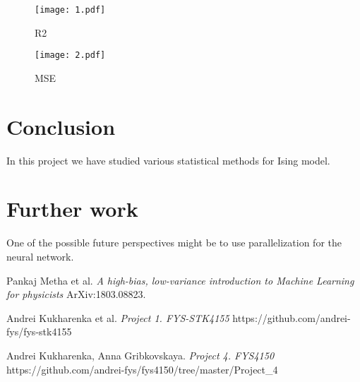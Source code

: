 \documentclass[10pt]{article}
\begin{document}
\begin{figure}
	\centerline{\texttt{[image: 1.pdf]}}
	\caption{R2}
	\label{plt:R2"}
\end{figure}

\begin{figure}
	\centerline{\texttt{[image: 2.pdf]}}
	\caption{MSE}
	\label{plt:MSE"}
\end{figure}


\section{Conclusion}
In this project we have studied various statistical methods for Ising model.

\section{Further work}
One of the possible future perspectives might be to use parallelization for the neural network.


\newpage
\begin{thebibliography}{9}
	Pankaj Metha et al. 
	\textit{A high-bias, low-variance introduction to Machine Learning for physicists}
	ArXiv:1803.08823.
	
	Andrei Kukharenka et al.
	\textit{Project 1. FYS-STK4155 }
	https://github.com/andrei-fys/fys-stk4155
	
	Andrei Kukharenka, Anna Gribkovskaya.
	\textit{Project 4. FYS4150 }
	https://github.com/andrei-fys/fys4150/tree/master/Project_4
	
\end{thebibliography}
\end{document}
